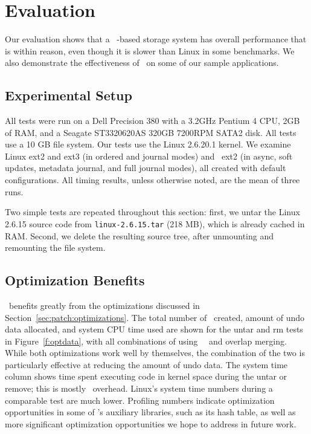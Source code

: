 \section {Evaluation}
\label{sec:evaluation}

Our evaluation shows that a \Kudos\ \patch-based storage system has
overall performance that is within reason, even though it is slower
than Linux in some benchmarks. We also demonstrate the effectiveness
of \patchgroups\ on some of our sample applications.

\subsection{Experimental Setup}

All tests were run on a Dell Precision 380 with a 3.2GHz Pentium 4
CPU, 2GB of RAM, and a Seagate ST3320620AS 320GB 7200RPM SATA2 disk.
%
All tests use a 10 GB file system.
%
Our tests use the Linux 2.6.20.1 kernel. We examine Linux ext2 and ext3
(in ordered and journal modes) and \Kudos\ ext2 (in async, soft updates,
metadata journal, and full journal modes), all created with default
configurations.
%
All timing results, unless otherwise noted, are the mean of three runs.

Two simple tests are repeated throughout this section: first, we untar
the Linux 2.6.15 source code from \texttt{linux-2.6.15.tar} (218 MB), which is
already cached in RAM. Second, we delete the resulting source
tree, after unmounting and remounting the file system.

\subsection {Optimization Benefits}

\Kudos\ benefits greatly from the optimizations discussed in
Section~\ref{sec:patch:optimizations}. The total number of \patches\ created,
amount of undo data allocated, and system CPU time used are shown for the
untar and rm tests in Figure~\ref{f:optdata}, with all combinations of using
\nrb\ \patches\ and overlap merging. While both optimizations work well by
themselves, the combination of the two is particularly effective at reducing the
amount of undo data.
%
The system time column shows time spent executing code in kernel space
during the untar or remove; this is mostly \Kudos\ overhead.  Linux's
system time numbers during a comparable test are much lower.  Profiling
numbers indicate optimization opportunities in some of \Kudos's auxiliary
libraries, such as its hash table, as well as more significant optimization
opportunities we hope to address in future work.


